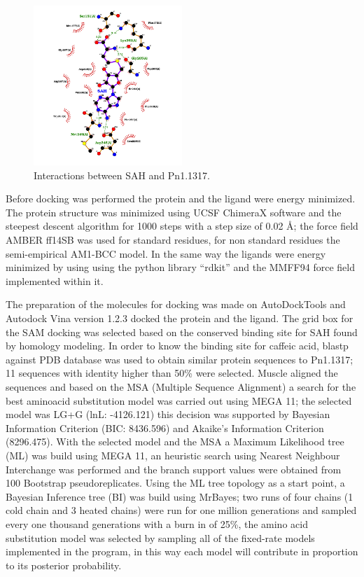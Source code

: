 \documentclass[12pt]{article}
\begin{document}
	\FloatBarrier
	\begin{figure}
		\centering
		\includegraphics[width=0.5\textwidth]{../4/Swiss/sah.png}
		\caption{\centering Interactions between SAH and Pn1.1317.}
		\label{fig4_3}
	\end{figure}
	\FloatBarrier
	
	Before docking was performed the protein and the ligand were energy minimized. The protein structure was minimized using UCSF ChimeraX software \cite{chimera,chimera_2} and the steepest descent algorithm for 1000 steps with a step size of 0.02 \r{A}; the force field AMBER ff14SB was used for standard residues, for non standard residues the semi-empirical AM1-BCC model. \cite{am1_bcc,am1_bcc_2,am1_bcc_3} In the same way the ligands were energy minimized by using using the python library ``rdkit'' and the MMFF94 force field implemented within it. \cite{rdkit,rdkit_mmff}
	
	The preparation of the molecules for docking was made on AutoDockTools and Autodock Vina version 1.2.3 docked the protein and the ligand. \cite{adt,vina,vina_2} The grid box for the SAM docking was selected based on the conserved binding site for SAH found by homology modeling. In order to know the binding site for caffeic acid, blastp against PDB database was used to obtain similar protein sequences to Pn1.1317; 11 sequences with identity higher than 50\% were selected. \cite{blastp,blastp_2} Muscle aligned the sequences and based on the MSA (Multiple Sequence Alignment) a search for the best aminoacid substitution model was carried out using MEGA 11; the selected model was LG+G (lnL: -4126.121) this decision was supported by Bayesian Information Criterion (BIC: 8436.596) and Akaike's Information Criterion (8296.475). \cite{muscle,mega11} With the selected model and the MSA a Maximum Likelihood tree (ML) was build using MEGA 11, an heuristic search using Nearest Neighbour Interchange was performed and the branch support values were obtained from 100 Bootstrap pseudoreplicates. \cite{mega11} Using the ML tree topology as a start point, a Bayesian Inference tree (BI) was build using MrBayes; two runs of four chains (1 cold chain and 3 heated chains) were run for one million generations and sampled every one thousand generations with a burn in of 25\%, the amino acid substitution model was selected by sampling all of the fixed-rate models implemented in the program, in this way each model will contribute in proportion to its posterior probability. \cite{mrbayes}
	
\end{document}
